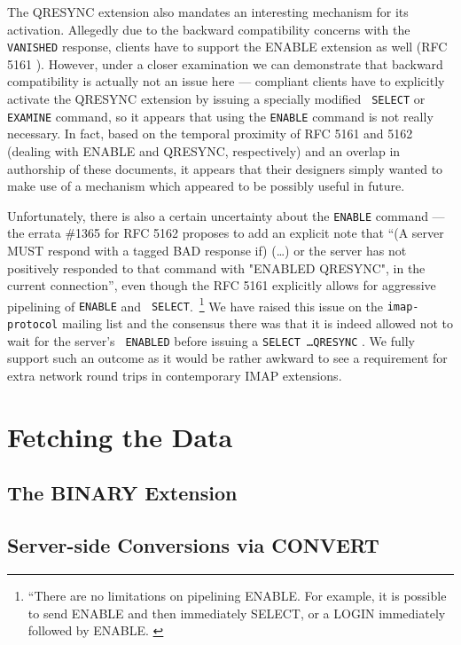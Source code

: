 \documentclass[trojita]{subfiles}
\begin{document}
The QRESYNC extension also mandates an interesting mechanism for its activation.  Allegedly due to the backward
compatibility concerns with the {\tt VANISHED} response, clients have to support the ENABLE extension as well (RFC 5161
\cite{rfc5161}).  However, under a closer examination we can demonstrate that backward compatibility is actually not an
issue here --- compliant clients have to explicitly activate the QRESYNC extension by issuing a specially modified {\tt
SELECT} or {\tt EXAMINE} command, so it appears that using the {\tt ENABLE} command is not really necessary.  In fact,
based on the temporal proximity of RFC 5161 and 5162 (dealing with ENABLE and QRESYNC, respectively) and an overlap in
authorship of these documents, it appears that their designers simply wanted to make use of a mechanism which appeared
to be possibly useful in future.

Unfortunately, there is also a certain uncertainty about the {\tt ENABLE} command --- the errata \#1365 for RFC 5162
\cite{rfc5162-errata} proposes to add an explicit note that ``(A server MUST respond with a tagged BAD
response if) (\ldots) or the server has not positively responded to that command with "ENABLED QRESYNC", in the current
connection'', even though the RFC 5161 explicitly allows for aggressive pipelining of {\tt ENABLE} and {\tt
SELECT}.~\footnote{``There are no limitations on pipelining ENABLE.  For example, it is possible to send ENABLE and then
immediately SELECT, or a LOGIN immediately followed by ENABLE. \cite[p. 2]{rfc5161}}  We have raised this issue on the
{\tt imap-protocol} mailing list and the consensus there was that it is indeed allowed not to wait for the server's {\tt
ENABLED} before issuing a {\tt SELECT \ldots QRESYNC} \cite{melnikov-qresync-enable}.  We fully support such an outcome
as it would be rather awkward to see a requirement for extra network round trips in contemporary IMAP extensions.

\section{Fetching the Data}

\subsection{The BINARY Extension}

\cite{rfc3516}

\subsection{Server-side Conversions via CONVERT}
\end{document}
